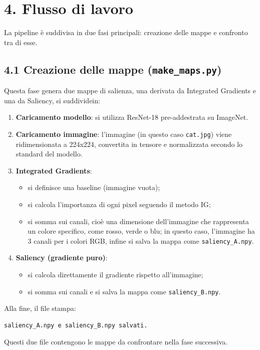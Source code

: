 \documentclass[a4paper,11pt]{article}
\begin{document}
\section*{4. Flusso di lavoro}
La pipeline è suddivisa in due fasi principali: creazione delle mappe e confronto tra di esse.

\subsection*{4.1 Creazione delle mappe (\texttt{make\_maps.py})}
Questa fase genera due mappe di salienza, una derivata da Integrated Gradients e una da Saliency, si suddividein:

\begin{enumerate}
\item \textbf{Caricamento modello}: si utilizza ResNet-18 pre-addestrata su ImageNet.
\item \textbf{Caricamento immagine}: l'immagine (in questo caso \texttt{cat.jpg}) viene ridimensionata a 224x224, convertita in tensore e normalizzata secondo lo standard del modello.
\item \textbf{Integrated Gradients}:
\begin{itemize}
\item si definisce una baseline (immagine vuota);
\item si calcola l'importanza di ogni pixel seguendo il metodo IG;
\item si somma sui canali, cioè una dimensione dell'immagine che rappresenta un colore specifico, come rosso, verde o blu; in questo caso, l'immagine ha 3 canali per i colori RGB, infine si salva la mappa come \texttt{saliency\_A.npy}.
\end{itemize}
\item \textbf{Saliency (gradiente puro)}:
\begin{itemize}
\item si calcola direttamente il gradiente rispetto all'immagine;
\item si somma sui canali e si salva la mappa come \texttt{saliency\_B.npy}.
\end{itemize}
\end{enumerate}

Alla fine, il file stampa:
\begin{verbatim}
saliency_A.npy e saliency_B.npy salvati.
\end{verbatim}

Questi due file contengono le mappe da confrontare nella fase successiva.
\end{document}
